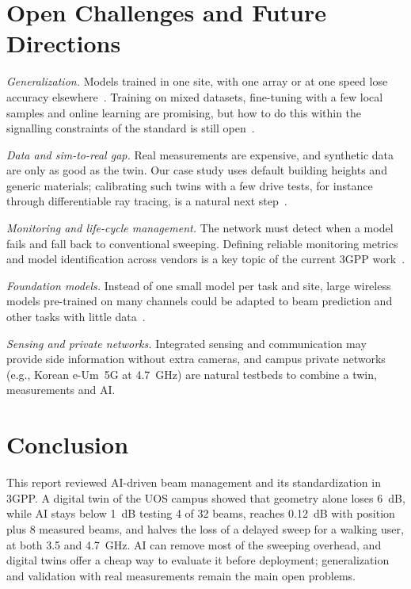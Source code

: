 \documentclass[journal]{IEEEtran}
\begin{document}
\section{Open Challenges and Future Directions}
\label{sec:open}
\emph{Generalization.} Models trained in one site, with one array or at one speed lose accuracy elsewhere~\cite{jayaweera2024bm}. Training on mixed datasets, fine-tuning with a few local samples and online learning are promising, but how to do this within the signalling constraints of the standard is still open~\cite{xue2023standard}.

\emph{Data and sim-to-real gap.} Real measurements are expensive, and synthetic data are only as good as the twin. Our case study uses default building heights and generic materials; calibrating such twins with a few drive tests, for instance through differentiable ray tracing, is a natural next step~\cite{alkhateeb2023twins,hoydis2023sionnart}.

\emph{Monitoring and life-cycle management.} The network must detect when a model fails and fall back to conventional sweeping. Defining reliable monitoring metrics and model identification across vendors is a key topic of the current 3GPP work~\cite{xue2023standard,gao2026rel19}.

\emph{Foundation models.} Instead of one small model per task and site, large wireless models pre-trained on many channels could be adapted to beam prediction and other tasks with little data~\cite{alikhani2024lwm}.

\emph{Sensing and private networks.} Integrated sensing and communication may provide side information without extra cameras, and campus private networks (e.g., Korean e-Um~5G at 4.7~GHz) are natural testbeds to combine a twin, measurements and AI.

\section{Conclusion}
\label{sec:concl}
This report reviewed AI-driven beam management and its standardization in 3GPP. A digital twin of the UOS campus showed that geometry alone loses 6~dB, while AI stays below 1~dB testing 4 of 32 beams, reaches 0.12~dB with position plus 8 measured beams, and halves the loss of a delayed sweep for a walking user, at both 3.5 and 4.7~GHz. AI can remove most of the sweeping overhead, and digital twins offer a cheap way to evaluate it before deployment; generalization and validation with real measurements remain the main open problems.



\end{document}
